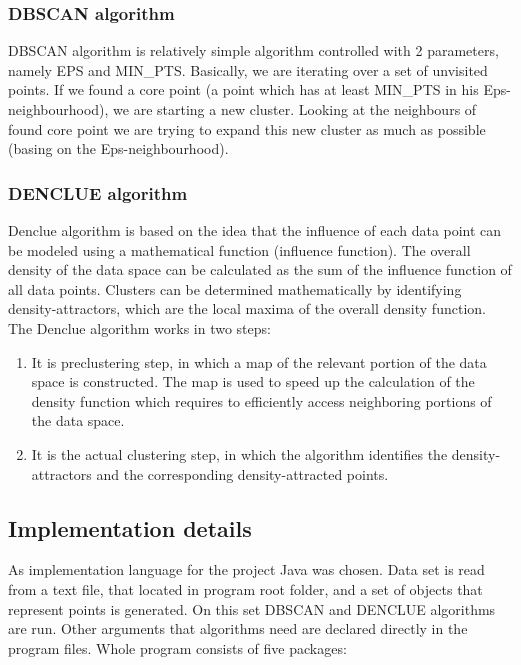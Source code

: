 \documentclass[12pt, a4paper, notitlepage, oneside]{article}
\begin{document}
\subsubsection*{DBSCAN algorithm}

DBSCAN algorithm is relatively simple algorithm controlled with 2 parameters, namely EPS and MIN\_PTS. \cite{dbscan}
Basically, we are iterating over a set of unvisited points. If we found a core point (a point which has
at least MIN\_PTS in his Eps-neighbourhood), we are starting a new cluster. Looking at the neighbours 
of found core point we are trying to expand this new cluster as much as possible (basing on the Eps-neighbourhood).



\subsubsection*{DENCLUE algorithm}

Denclue algorithm is based on the idea that the influence of each data point can be modeled using a mathematical function (influence function). The overall density of the data space can be calculated as the sum of the influence function of all data points. Clusters can be determined mathematically by identifying density-attractors, which are the local maxima of the overall density function. The Denclue algorithm works in two steps:

\begin{enumerate}
	\item It is preclustering step, in which a map of the relevant portion of the data space is constructed. The map is used to speed up the calculation of the density function which requires to efficiently access neighboring portions of the data space. 
	
	\item It is the actual clustering step, in which the algorithm identifies the density-attractors and the corresponding density-attracted points.
\end{enumerate}

\subsection*{Implementation details}

As implementation language for the project Java was chosen. 
Data set is read from a text file, that located in program root folder, and a set of objects that represent points is generated. 
On this set DBSCAN and DENCLUE algorithms are run. 
Other arguments that algorithms need are declared directly in the program files. Whole program consists of five packages:
\end{document}
